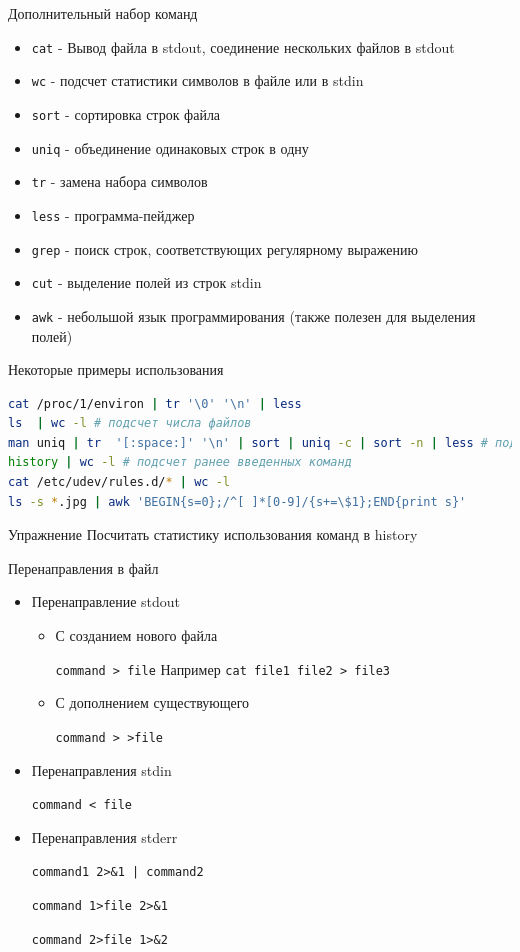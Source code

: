 \documentclass[ignorenonframetext, professionalfonts, hyperref={pdftex, unicode}]{beamer}
\begin{document}
\begin{frame}{Дополнительный набор команд}
  \begin{itemize}
    \item {\tt cat} - Вывод файла в stdout, соединение нескольких файлов в stdout
    \item {\tt wc} - подсчет статистики символов в файле или в stdin 
    \item {\tt sort} - сортировка строк файла
    \item {\tt uniq} - объединение одинаковых строк в одну
    \item {\tt tr} - замена набора символов
    \item {\tt less} - программа-пейджер
    \item {\tt grep} - поиск строк, соответствующих регулярному выражению
    \item {\tt cut} - выделение полей из строк stdin
    \item {\tt awk} - небольшой язык программирования (также полезен для выделения полей)
  \end{itemize}
\end{frame}

\begin{frame}[fragile]{Некоторые примеры использования}
\begin{lstlisting}[language=bash]
cat /proc/1/environ | tr '\0' '\n' | less
ls  | wc -l # подсчет числа файлов
man uniq | tr  '[:space:]' '\n' | sort | uniq -c | sort -n | less # подсчет количества слов в тексте man uniq
history | wc -l # подсчет ранее введенных команд
cat /etc/udev/rules.d/* | wc -l
ls -s *.jpg | awk 'BEGIN{s=0};/^[ ]*[0-9]/{s+=\$1};END{print s}' 
\end{lstlisting}
  \pause
  \begin{block}{Упражнение}
    Посчитать статистику использования команд в history
  \end{block}
\end{frame}

\begin{frame}{Перенаправления в файл}

\begin{itemize}
  \item Перенаправление stdout 
    \begin{itemize}
      \item С созданием нового файла

        {\tt command > file} Например {\tt cat file1 file2 > file3}
      \item С дополнением существующего

        {\tt command > >file}
    \end{itemize}
    \pause
  \item Перенаправления stdin

    {\tt command < file}
    \pause
  \item Перенаправления stderr

    {\tt command1 2>\&1 | command2}

   {\tt command 1>file 2>\&1}

   {\tt command 2>file 1>\&2}
\end{itemize}

\end{frame}
\end{document}
